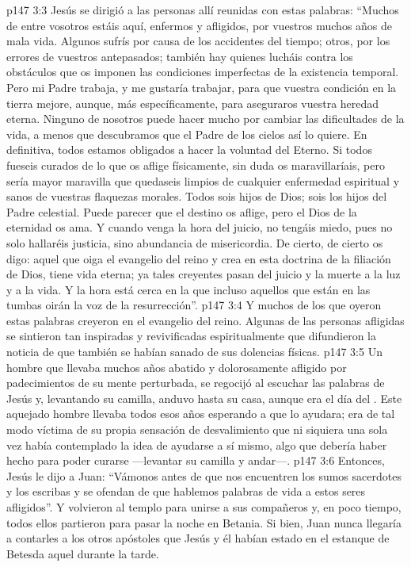 \vs p147 3:3 Jesús se dirigió a las personas allí reunidas con estas palabras: “Muchos de entre vosotros estáis aquí, enfermos y afligidos, por vuestros muchos años de mala vida. Algunos sufrís por causa de los accidentes del tiempo; otros, por los errores de vuestros antepasados; también hay quienes lucháis contra los obstáculos que os imponen las condiciones imperfectas de la existencia temporal. Pero mi Padre trabaja, y me gustaría trabajar, para que vuestra condición en la tierra mejore, aunque, más específicamente, para aseguraros vuestra heredad eterna. Ninguno de nosotros puede hacer mucho por cambiar las dificultades de la vida, a menos que descubramos que el Padre de los cielos así lo quiere. En definitiva, todos estamos obligados a hacer la voluntad del Eterno. Si todos fueseis curados de lo que os aflige físicamente, sin duda os maravillaríais, pero sería mayor maravilla que quedaseis limpios de cualquier enfermedad espiritual y sanos de vuestras flaquezas morales. Todos sois hijos de Dios; sois los hijos del Padre celestial. Puede parecer que el destino os aflige, pero el Dios de la eternidad os ama. Y cuando venga la hora del juicio, no tengáis miedo, pues no solo hallaréis justicia, sino abundancia de misericordia. De cierto, de cierto os digo: aquel que oiga el evangelio del reino y crea en esta doctrina de la filiación de Dios, tiene vida eterna; ya tales creyentes pasan del juicio y la muerte a la luz y a la vida. Y la hora está cerca en la que incluso aquellos que están en las tumbas oirán la voz de la resurrección”.
\vs p147 3:4 Y muchos de los que oyeron estas palabras creyeron en el evangelio del reino. Algunas de las personas afligidas se sintieron tan inspiradas y revivificadas espiritualmente que difundieron la noticia de que también se habían sanado de sus dolencias físicas.
\vs p147 3:5 Un hombre que llevaba muchos años abatido y dolorosamente afligido por padecimientos de su mente perturbada, se regocijó al escuchar las palabras de Jesús y, levantando su camilla, anduvo hasta su casa, aunque era el día del . Este aquejado hombre llevaba todos esos años esperando a  que lo ayudara; era de tal modo víctima de su propia sensación de desvalimiento que ni siquiera una sola vez había contemplado la idea de ayudarse a sí mismo, algo que debería haber hecho para poder curarse ---levantar su camilla y andar---.
\vs p147 3:6 Entonces, Jesús le dijo a Juan: “Vámonos antes de que nos encuentren los sumos sacerdotes y los escribas y se ofendan de que hablemos palabras de vida a estos seres afligidos”. Y volvieron al templo para unirse a sus compañeros y, en poco tiempo, todos ellos partieron para pasar la noche en Betania. Si bien, Juan nunca llegaría a contarles a los otros apóstoles que Jesús y él habían estado en el estanque de Betesda aquel  durante la tarde.
